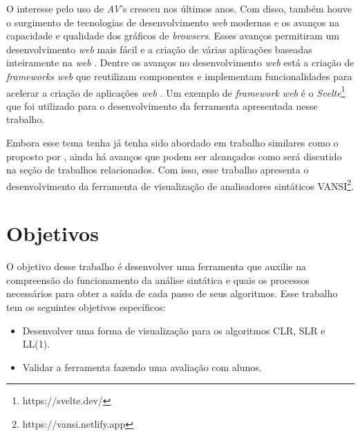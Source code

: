 O interesse pelo uso de \textit{AV}'s cresceu nos últimos anos. Com disso, também houve o surgimento de tecnologias de desenvolvimento \textit{web} modernas e os avanços na capacidade e qualidade dos gráficos de \textit{browsers}. Esses avanços permitiram um desenvolvimento \textit{web} mais fácil e a criação de várias aplicações baseadas inteiramente na \textit{web} \cite{effectiveav}. Dentre os avanços no desenvolvimento \textit{web} está a criação de \textit{frameworks web} que reutilizam componentes e implementam funcionalidades para acelerar a criação de aplicações \textit{web} \cite{uppal2022}. Um exemplo de \textit{framework web} é o \textit{Svelte}\footnote{https://svelte.dev/} que foi utilizado para o desenvolvimento da ferramenta apresentada nesse trabalho.

Embora esse tema tenha já tenha sido abordado em trabalho similares como o proposto por \textcite{pavt}, ainda há avanços que podem ser alcançados como será discutido na seção de trabalhos relacionados. Com isso, esse trabalho apresenta o desenvolvimento da ferramenta de visualização de analisadores sintáticos VANSI\footnote{https://vansi.netlify.app}.

\section{Objetivos}
O objetivo desse trabalho é desenvolver uma ferramenta que auxilie na compreensão do funcionamento da análise sintática e quais os processos necessários para obter a saída de cada passo de seus algoritmos. Esse trabalho tem os seguintes objetivos específicos:
\begin{itemize}[label=$\sbullet$]
    \item Desenvolver uma forma de visualização para os algoritmos CLR, SLR e LL(1).
    \item Validar a ferramenta fazendo uma avaliação com alunos.
\end{itemize}

